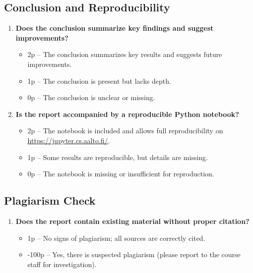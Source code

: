 \documentclass{article}
\begin{document}
	\subsection{Conclusion and Reproducibility}
\begin{enumerate}[resume]
		\item \textbf{Does the conclusion summarize key findings and suggest improvements?}  
		\begin{itemize}
			\item 2p – The conclusion summarizes key results and suggests future improvements.
			\item 1p – The conclusion is present but lacks depth.
			\item 0p – The conclusion is unclear or missing.
		\end{itemize}
		
		\item \textbf{Is the report accompanied by a reproducible Python notebook?}  
		\begin{itemize}
			\item 2p – The notebook is included and allows full reproducibility on \url{https://jupyter.cs.aalto.fi/}.
			\item 1p – Some results are reproducible, but details are missing.
			\item 0p – The notebook is missing or insufficient for reproduction.
		\end{itemize}
	\end{enumerate}
	
	\subsection{Plagiarism Check}
     \begin{enumerate}[resume]
		\item \textbf{Does the report contain existing material without proper citation?}  
		\begin{itemize}
			\item 1p – No signs of plagiarism; all sources are correctly cited.
			\item -100p – Yes, there is suspected plagiarism (please report to the course staff for investigation).
		\end{itemize}
	\end{enumerate}
	
\end{document}
